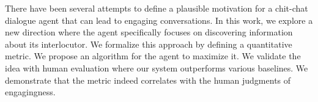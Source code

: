 There have been several attempts to define a plausible motivation for a chit-chat dialogue agent that can lead to engaging conversations. In this work, we explore a new direction where the agent specifically focuses on discovering information about its interlocutor. We formalize this approach by defining a quantitative metric. We propose an algorithm for the agent to maximize it. We validate the idea with human evaluation where our system outperforms various baselines. We demonstrate that the metric indeed correlates with the human judgments of engagingness.
